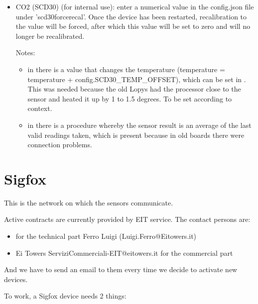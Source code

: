 \begin{itemize}
 \item CO2 (SCD30) (for internal use): enter a numerical value in the config.json file under 'scd30forcerecal'. Once the device has been restarted, recalibration to the value will be forced, after which this value will be set to zero and will no longer be recalibrated.
 
 Notes:
   \begin{itemize}
       \item in  there is a value that changes the temperature (temperature = temperature + config.SCD30\_TEMP\_OFFSET), which can be set in . This was needed because the old Lopys had the processor close to the sensor and heated it up by 1 to 1.5 degrees. To be set according to context.
  \item in  there is a procedure whereby the sensor result is an average of the last valid readings taken, which is present because in old boards there were connection problems.
   \end{itemize}
 
\end{itemize}

 \section{Sigfox}
 
     This is the network on which the sensors communicate.
     
     Active contracts are currently provided by EIT service. The contact persons are:
     
     \bigskip
     
     \begin{itemize}
         \item for the technical part Ferro Luigi (Luigi.Ferro@Eitowers.it)
         \item Ei Towers ServiziCommerciali-EIT@eitowers.it for the commercial part
     \end{itemize}

     And we have to send an email to them every time we decide to activate new devices.
     
     \bigskip
     
     To work, a Sigfox device needs 2 things:
     
